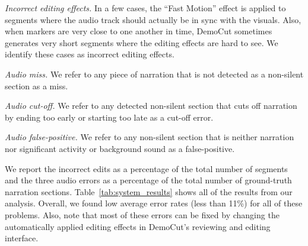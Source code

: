 {\em Incorrect editing effects.} In a few cases, the ``Fast Motion''
effect is applied to segments where the audio track should actually be
in sync with the visuals. Also, when markers are very close to one
another in time, DemoCut sometimes generates very short segments where the editing effects are hard to see.
%
We identify these cases as incorrect editing effects.

{\em Audio miss.} We refer to any piece of narration that is not
detected as a non-silent section as a miss.

{\em Audio cut-off.} We refer to any detected non-silent section that
cuts off narration by ending too early or starting too late as a
cut-off error.

{\em Audio false-positive.} We refer to any non-silent section that is
neither narration nor significant activity or background sound as a false-positive.

We report the incorrect edits as a percentage of the total number of
segments and the three audio errors as a percentage of the total
number of ground-truth narration sections.
%
Table~\ref{tab:system_results} shows all of the results from our
analysis.
%
Overall, we found low average error rates (less than 11\%) for all of
these problems.
%
Also, note that most of these errors can be fixed by changing the
automatically applied editing effects in DemoCut's reviewing and
editing interface.

